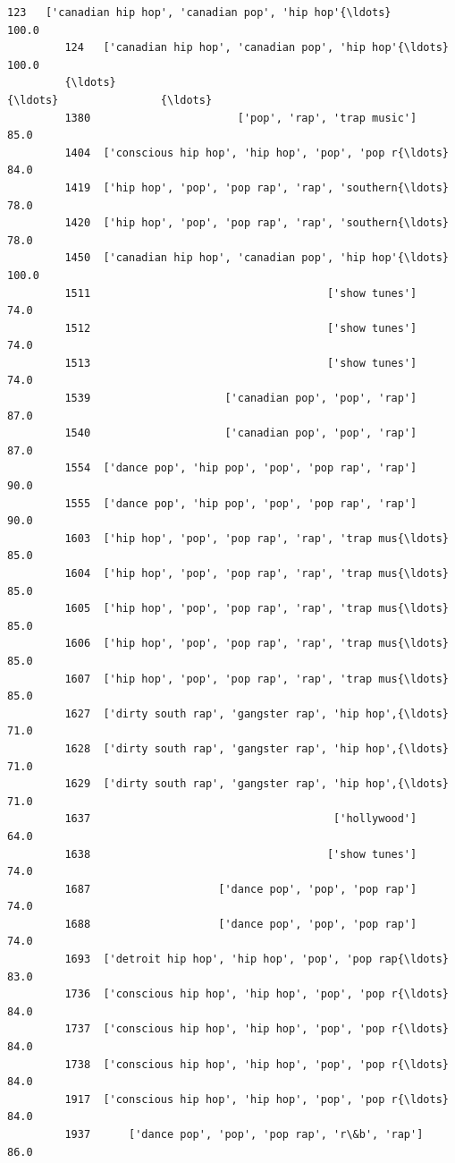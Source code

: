 \documentclass[11pt]{article}
\begin{document}
\begin{Verbatim}[commandchars=\\\{\}]
         123   ['canadian hip hop', 'canadian pop', 'hip hop'{\ldots}              100.0   
         124   ['canadian hip hop', 'canadian pop', 'hip hop'{\ldots}              100.0   
         {\ldots}                                                 {\ldots}                {\ldots}   
         1380                       ['pop', 'rap', 'trap music']               85.0   
         1404  ['conscious hip hop', 'hip hop', 'pop', 'pop r{\ldots}               84.0   
         1419  ['hip hop', 'pop', 'pop rap', 'rap', 'southern{\ldots}               78.0   
         1420  ['hip hop', 'pop', 'pop rap', 'rap', 'southern{\ldots}               78.0   
         1450  ['canadian hip hop', 'canadian pop', 'hip hop'{\ldots}              100.0   
         1511                                     ['show tunes']               74.0   
         1512                                     ['show tunes']               74.0   
         1513                                     ['show tunes']               74.0   
         1539                     ['canadian pop', 'pop', 'rap']               87.0   
         1540                     ['canadian pop', 'pop', 'rap']               87.0   
         1554  ['dance pop', 'hip pop', 'pop', 'pop rap', 'rap']               90.0   
         1555  ['dance pop', 'hip pop', 'pop', 'pop rap', 'rap']               90.0   
         1603  ['hip hop', 'pop', 'pop rap', 'rap', 'trap mus{\ldots}               85.0   
         1604  ['hip hop', 'pop', 'pop rap', 'rap', 'trap mus{\ldots}               85.0   
         1605  ['hip hop', 'pop', 'pop rap', 'rap', 'trap mus{\ldots}               85.0   
         1606  ['hip hop', 'pop', 'pop rap', 'rap', 'trap mus{\ldots}               85.0   
         1607  ['hip hop', 'pop', 'pop rap', 'rap', 'trap mus{\ldots}               85.0   
         1627  ['dirty south rap', 'gangster rap', 'hip hop',{\ldots}               71.0   
         1628  ['dirty south rap', 'gangster rap', 'hip hop',{\ldots}               71.0   
         1629  ['dirty south rap', 'gangster rap', 'hip hop',{\ldots}               71.0   
         1637                                      ['hollywood']               64.0   
         1638                                     ['show tunes']               74.0   
         1687                    ['dance pop', 'pop', 'pop rap']               74.0   
         1688                    ['dance pop', 'pop', 'pop rap']               74.0   
         1693  ['detroit hip hop', 'hip hop', 'pop', 'pop rap{\ldots}               83.0   
         1736  ['conscious hip hop', 'hip hop', 'pop', 'pop r{\ldots}               84.0   
         1737  ['conscious hip hop', 'hip hop', 'pop', 'pop r{\ldots}               84.0   
         1738  ['conscious hip hop', 'hip hop', 'pop', 'pop r{\ldots}               84.0   
         1917  ['conscious hip hop', 'hip hop', 'pop', 'pop r{\ldots}               84.0   
         1937      ['dance pop', 'pop', 'pop rap', 'r\&b', 'rap']               86.0   
         

\end{Verbatim}
\end{document}
